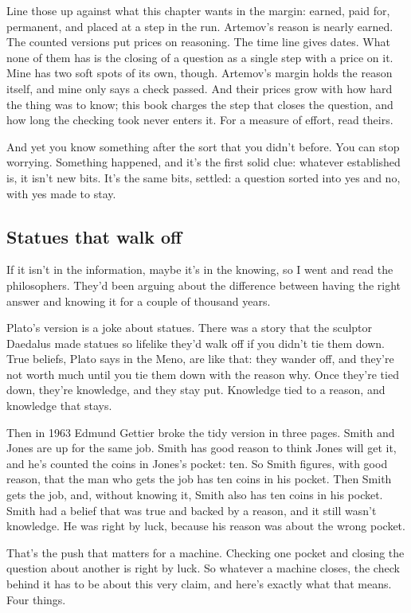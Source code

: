\documentclass[11pt,twoside]{article}
\theoremstyle{thielethm}
\theoremstyle{thieledef}
\theoremstyle{thieledef}
\theoremstyle{thieledef}
\theoremstyle{thielethm}
\theoremstyle{thieleobs}
\theoremstyle{thielethm}
\begin{document}
Line those up against what this chapter wants in the margin: earned, paid for, permanent, and placed at a step in the run. Artemov's reason is nearly earned. The counted versions put prices on reasoning. The time line gives dates. What none of them has is the closing of a question as a single step with a price on it. Mine has two soft spots of its own, though. Artemov's margin holds the reason itself, and mine only says a check passed. And their prices grow with how hard the thing was to know; this book charges the step that closes the question, and how long the checking took never enters it. For a measure of effort, read theirs.

And yet you know something after the sort that you didn't before. You can stop worrying. Something happened, and it's the first solid clue: whatever established is, it isn't new bits. It's the same bits, settled: a question sorted into yes and no, with yes made to stay.

\subsection{Statues that walk off}

If it isn't in the information, maybe it's in the knowing, so I went and read the philosophers. They'd been arguing about the difference between having the right answer and knowing it for a couple of thousand years.

Plato's version is a joke about statues. There was a story that the sculptor Daedalus made statues so lifelike they'd walk off if you didn't tie them down. True beliefs, Plato says in the Meno, are like that: they wander off, and they're not worth much until you tie them down with the reason why. Once they're tied down, they're knowledge, and they stay put. Knowledge tied to a reason, and knowledge that stays.

Then in 1963 Edmund Gettier broke the tidy version in three pages. Smith and Jones are up for the same job. Smith has good reason to think Jones will get it, and he's counted the coins in Jones's pocket: ten. So Smith figures, with good reason, that the man who gets the job has ten coins in his pocket. Then Smith gets the job, and, without knowing it, Smith also has ten coins in his pocket. Smith had a belief that was true and backed by a reason, and it still wasn't knowledge. He was right by luck, because his reason was about the wrong pocket.

That's the push that matters for a machine. Checking one pocket and closing the question about another is right by luck. So whatever a machine closes, the check behind it has to be about this very claim, and here's exactly what that means. Four things.
\end{document}
